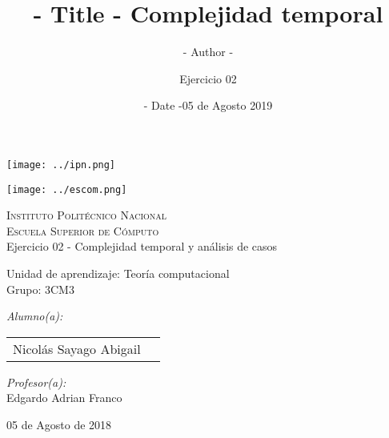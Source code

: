 \documentclass[12pt, letterpaper]{article}			%
\date{ - Date -}
\title{ - Title - }
\author{- Author -}
\date{05 de Agosto 2019}
\title{Complejidad temporal}
\author{Ejercicio 02}
\begin{document}
\begin{titlepage}
			\begin{center}
				\noindent
				\begin{minipage}{0.5\textwidth}
					\begin{flushleft} \large
						\texttt{[image: ../ipn.png]}
					\end{flushleft}
				\end{minipage}%
				\begin{minipage}{0.55\textwidth}
					\begin{flushright} \large
						\texttt{[image: ../escom.png]}
					\end{flushright}
				\end{minipage}
				
				\textsc{\LARGE Instituto Politécnico Nacional}\\[0.5cm]
				
				\textsc{\Large Escuela Superior de Cómputo}\\[1cm]
				
				
				{ \huge Ejercicio 02 - Complejidad temporal y análisis de casos  \\[1cm] }
				
				{ \Large Unidad de aprendizaje: Teoría computacional} \\[1cm]
				
				{ \Large Grupo: 3CM3 } \\[1cm]
				
				\noindent
				\begin{minipage}{0.5\textwidth}
					\begin{flushleft} \large
						\emph{Alumno(a):}\\
						
						\begin{tabular}{ll}
					     Nicolás Sayago Abigail\\
					\end{tabular}
					\end{flushleft}
				\end{minipage}%
				\begin{minipage}{0.5\textwidth}
					\begin{flushright} \large
						\emph{Profesor(a):} \\
					    Edgardo Adrian Franco  \\
					\end{flushright}
				\end{minipage}
				
				\vfill
				
				{\large 05 de Agosto de 2018}
			\end{center}
		\end{titlepage}
	\tableofcontents
\end{document}
